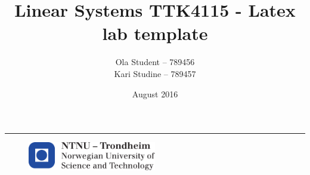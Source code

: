 \documentclass{article}
\title{Linear Systems TTK4115 - Latex lab template}
\author{Ola Student -- 789456 \\ Kari Studine -- 789457}
\date{August 2016}
\begin{document}
\begin{titlepage}
    \maketitle
    \rule{\linewidth}{0.5mm}
    \begin{figure}
    \centering
    \includegraphics[width=0.5\textwidth]{images/logontnu_eng}
    \end{figure}
    \thispagestyle{empty}
\end{titlepage}

\tableofcontents
\thispagestyle{empty} %
\newpage    

\setcounter{page}{1}





\newpage

\end{document}
